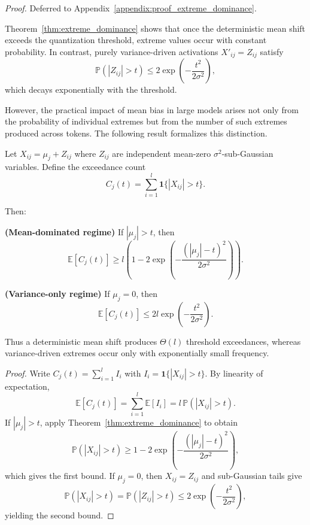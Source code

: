 \noindent\textit{Proof.} Deferred to Appendix~\ref{appendix:proof_extreme_dominance}.

Theorem~\ref{thm:extreme_dominance} shows that once the deterministic mean shift exceeds the quantization threshold, extreme values occur with constant probability. In contrast, purely variance-driven activations $X'_{ij} = Z_{ij}$ satisfy
\begin{equation}
\mathbb{P}(|Z_{ij}| > t)
\le
2\exp\!\left(-\frac{t^2}{2\sigma^2}\right),
\end{equation}
which decays exponentially with the threshold.

However, the practical impact of mean bias in large models arises not only from the probability of individual extremes but from the number of such extremes produced across tokens. The following result formalizes this distinction.

\begin{theorem}
\label{thm:dense_extreme}
Let $X_{ij} = \mu_j + Z_{ij}$ where $Z_{ij}$ are independent mean-zero $\sigma^2$-sub-Gaussian variables. Define the exceedance count
\[
C_j(t) = \sum_{i=1}^{l} \mathbf{1}\{|X_{ij}| > t\}.
\]

Then:

\textbf{(Mean-dominated regime)}  
If $|\mu_j| > t$, then
\[
\mathbb{E}[C_j(t)]
\ge
l\left(1 - 2\exp\!\left(-\frac{(|\mu_j|-t)^2}{2\sigma^2}\right)\right).
\]

\textbf{(Variance-only regime)}  
If $\mu_j = 0$, then
\[
\mathbb{E}[C_j(t)]
\le
2l\exp\!\left(-\frac{t^2}{2\sigma^2}\right).
\]

Thus a deterministic mean shift produces $\Theta(l)$ threshold exceedances, whereas variance-driven extremes occur only with exponentially small frequency.
\end{theorem}

\begin{proof}
Write $C_j(t)=\sum_{i=1}^{l} I_i$ with $I_i=\mathbf{1}\{|X_{ij}|>t\}$. By linearity of expectation,
\[
\mathbb{E}[C_j(t)] = \sum_{i=1}^{l} \mathbb{E}[I_i] = l\,\mathbb{P}(|X_{ij}|>t).
\]
If $|\mu_j|>t$, apply Theorem~\ref{thm:extreme_dominance} to obtain
\[
\mathbb{P}(|X_{ij}|>t) \ge 1-2\exp\!\left(-\frac{(|\mu_j|-t)^2}{2\sigma^2}\right),
\]
which gives the first bound. If $\mu_j=0$, then $X_{ij}=Z_{ij}$ and sub-Gaussian tails give
\[
\mathbb{P}(|X_{ij}|>t)=\mathbb{P}(|Z_{ij}|>t)\le 2\exp\!\left(-\frac{t^2}{2\sigma^2}\right),
\]
yielding the second bound.
\end{proof}

